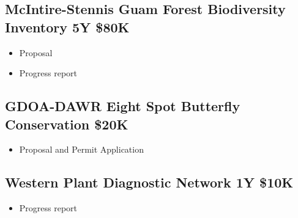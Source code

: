 \subsection{McIntire-Stennis Guam Forest Biodiversity Inventory 5Y \$80K}
\label{McIntire-Stennis Guam Forest Biodiversity Inventory}
\begin{refsection}
	\begin{itemize}
		\item Proposal \cite{moore_mcintire-stennis_2018}
		\item Progress report \cite{moore_guam_2020}
	\end{itemize}
	\printbibliography[heading=none]
\end{refsection}

\subsection{GDOA-DAWR Eight Spot Butterfly Conservation \$20K}
\label{eightspot}
\begin{refsection}
	\begin{itemize}
		\item Proposal and Permit Application \cite{aubrey_moore_application_2016}
	\end{itemize}
	\printbibliography[heading=none]
\end{refsection}


\subsection{Western Plant Diagnostic Network 1Y \$10K}
\label{WPDN}
\begin{refsection}
	\begin{itemize}
		\item Progress report \cite{moore_npdn_2018}
	\end{itemize}
	\printbibliography[heading=none]
\end{refsection}


